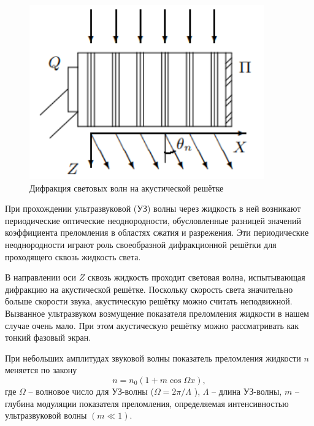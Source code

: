 \documentclass[a4paper,12pt]{article}
\begin{document}
\begin{figure}\label{fig: Diffraction on acoustic waves}
    \begin{center}
    \vspace{-20pt}
         \includegraphics[width = 0.9\textwidth]{Diffraction on acoustic waves.png}
    \end{center}
    \caption{Дифракция световых волн на акустической решётке}
\end{figure}
При прохождении ультразвуковой (УЗ) волны через жидкость в ней возникают периодические оптические неоднородности, обусловленные разницей значений коэффициента преломления в областях сжатия и разрежения. Эти периодические неоднородности играют роль своеобразной дифракционной решётки для проходящего сквозь жидкость света.

В направлении оси $Z$ сквозь жидкость проходит световая волна, испытывающая дифракцию на акустической решётке. Поскольку скорость света значительно больше скорости звука, акустическую решётку можно считать неподвижной. Вызванное ультразвуком возмущение показателя преломления жидкости в нашем случае очень мало. При этом акустическую решётку можно рассматривать как тонкий фазовый экран.

При небольших амплитудах звуковой волны показатель преломления жидкости $n$ меняется по закону
\begin{equation}\label{eq: n(x)}
    n = n_0(1 + m\cos\Omega x),
\end{equation}
где $\Omega$ -- волновое число для УЗ-волны ($\Omega = 2\pi / \Lambda$ ), $\Lambda$ -- длина УЗ-волны, $m$ -- глубина модуляции показателя преломления, определяемая интенсивностью ультразвуковой волны $(m \ll 1)$.
\end{document}
